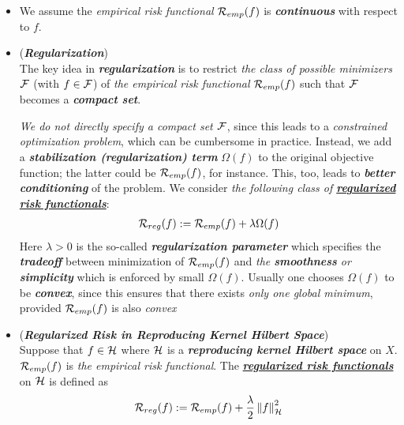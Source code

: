 \documentclass[11pt]{article}
\begin{document}
\begin{itemize}
\item \begin{remark}
We assume the \emph{empirical risk functional} ${\mathcal R}_{emp}(f) $ is \emph{\textbf{continuous}} with respect to $f$.
\end{remark}


\item \begin{remark} (\emph{\textbf{Regularization}})\\
The key idea in \emph{\textbf{regularization}} is to restrict \emph{the class of possible minimizers} ${\mathcal F}$ (with $f\in {\mathcal F}$) of \emph{the empirical risk functional} ${\mathcal R}_{emp}(f) $ such that ${\mathcal F}$ becomes a \emph{\textbf{compact set}}.

\emph{We do not directly specify a compact set ${\mathcal F}$}, since this leads to a \emph{constrained optimization problem}, which can be cumbersome in practice. Instead, we add a \emph{\textbf{stabilization (regularization) term}} $\Omega(f)$ to the original objective function; the latter could be ${\mathcal R}_{emp}(f)$, for instance. This, too, leads to \emph{\textbf{better conditioning}} of the problem. We consider \emph{the following class of \underline{\textbf{regularized risk functionals}}}:
\begin{align*}
{\mathcal R}_{reg}(f)  := {\mathcal R}_{emp}(f) + \lambda \Omega(f)
\end{align*}
Here $\lambda > 0$ is the so-called \emph{\textbf{regularization parameter}} which specifies the \emph{\textbf{tradeoff}} between minimization of ${\mathcal R}_{emp}(f)$ and \emph{the \textbf{smoothness} or \textbf{simplicity}} which is enforced by small $\Omega(f)$. Usually one chooses $\Omega(f)$ to be \emph{\textbf{convex}}, since this ensures that there exists \emph{only one global minimum}, provided ${\mathcal R}_{emp}(f)$ is also \emph{convex}
\end{remark}

\item \begin{definition} (\emph{\textbf{Regularized Risk in Reproducing Kernel Hilbert Space}})\\
Suppose that $f \in {\mathcal H}$ where ${\mathcal H}$ is a \emph{\textbf{reproducing kernel Hilbert space}} on $X$. ${\mathcal R}_{emp}(f)$ is \emph{the empirical risk functional}. The \underline{\textbf{\emph{regularized risk functionals}}} on ${\mathcal H}$ is defined as
\begin{align*}
{\mathcal R}_{reg}(f)  := {\mathcal R}_{emp}(f) + \frac{\lambda}{2} \left\|f\right\|_{{\mathcal H}}^2
\end{align*}
\end{definition}


\end{itemize}
\end{document}
